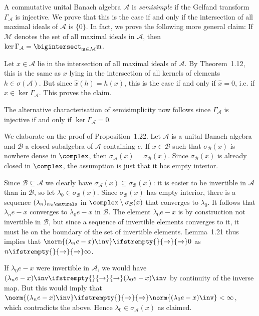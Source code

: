 \documentclass[article, a4paper, 11pt, oneside]{memoir}
\numberwithin{equation}{chapter}
\newcommand{\calB}{\mathcal{B}}
\newcommand{\calA}{\mathcal{A}}
\newcommand{\calM}{\mathcal{M}}
\renewcommand\to[1][]{%
    \ifstrempty{#1}{%
        \rightarrow
    }{%
        \xrightarrow[#1]{}
    }%
}
\begin{document}
\begin{remark}
    A commutative unital Banach algebra $\calA$ is \emph{semisimple} if the Gelfand transform $\Gamma_\calA$ is injective. We prove that this is the case if and only if the intersection of all maximal ideals of $\calA$ is $\{0\}$. In fact, we prove the following more general claim: If $\calM$ denotes the set of all maximal ideals in $\calA$, then $\ker\Gamma_\calA = \bigintersect_{\frakm\in\calM} \frakm$.

    Let $x \in \calA$ lie in the intersection of all maximal ideals of $\calA$. By Theorem~1.12, this is the same as $x$ lying in the intersection of all kernels of elements $h \in \sigma(\calA)$. But since $\hat{x}(h) = h(x)$, this is the case if and only if $\hat{x} = 0$, i.e. if $x \in \ker \Gamma_\calA$. This proves the claim.

    The alternative characterisation of semisimplicity now follows since $\Gamma_\calA$ is injective if and only if $\ker \Gamma_\calA = 0$.
\end{remark}


\begin{remark}
    We elaborate on the proof of Proposition~1.22. Let $\calA$ is a unital Banach algebra and $\calB$ a closed subalgebra of $\calA$ containing $e$. If $x \in \calB$ such that $\sigma_\calB(x)$ is nowhere dense in $\complex$, then $\sigma_\calA(x) = \sigma_\calB(x)$. Since $\sigma_\calB(x)$ is already closed in $\complex$, the assumption is just that it has empty interior.

    Since $\calB \subseteq \calA$ we clearly have $\sigma_\calA(x) \subseteq \sigma_\calB(x)$: it is easier to be invertible in $\calA$ than in $\calB$, so let $\lambda_0 \in \sigma_\calB(x)$. Since $\sigma_\calB(x)$ has empty interior, there is a sequence $(\lambda_n)_{n\in\naturals}$ in $\complex \setminus \sigma_\calB(x)$ that converges to $\lambda_0$. It follows that $\lambda_n e - x$ converges to $\lambda_0 e - x$ in $\calB$. The element $\lambda_0 e - x$ is by construction not invertible in $\calB$, but since a sequence of invertible elements converges to it, it must lie on the boundary of the set of invertible elements. Lemma~1.21 thus implies that $\norm{(\lambda_n e - x)\inv} \to 0$ as $n \to \infty$.
    
    If $\lambda_0 e - x$ were invertible in $\calA$, we would have $(\lambda_n e - x)\inv \to (\lambda_0 e - x)\inv$ by continuity of the inverse map. But this would imply that $\norm{(\lambda_n e - x)\inv} \to \norm{(\lambda_0 e - x)\inv} < \infty$, which contradicts the above. Hence $\lambda_0 \in \sigma_\calA(x)$ as claimed.
\end{remark}
\end{document}
